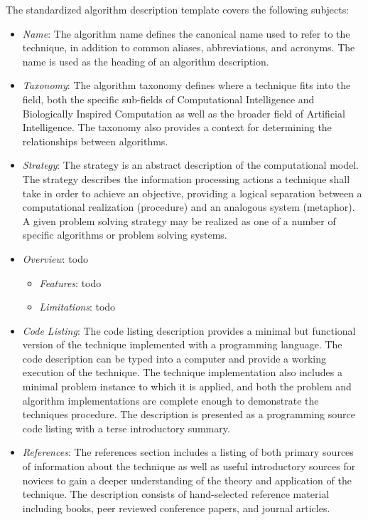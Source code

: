 The standardized algorithm description template covers the following subjects:
\begin{itemize}
	\item \emph{Name}: The algorithm name defines the canonical name used to refer to the technique, in addition to common aliases, abbreviations, and acronyms. The name is used as the heading of an algorithm description.
	\item \emph{Taxonomy}: The algorithm taxonomy defines where a technique fits into the field, both the specific sub-fields of Computational Intelligence and Biologically Inspired Computation as well as the broader field of Artificial Intelligence. The taxonomy also provides a context for determining the relationships between algorithms.
	\item \emph{Strategy}: The strategy is an abstract description of the computational model. The strategy describes the information processing actions a technique shall take in order to achieve an objective, providing a logical separation between a computational realization (procedure) and an analogous system (metaphor). A given problem solving strategy may be realized as one of a number of specific algorithms or problem solving systems.
	\item \emph{Overview}: todo
	 \begin{itemize}
			\item \emph{Features}: todo
			\item \emph{Limitations}: todo
		\end{itemize}
	\item \emph{Code Listing}: The code listing description provides a minimal but functional version of the technique implemented with a programming language. The code description can be typed into a computer and provide a working execution of the technique. The technique implementation also includes a minimal problem instance to which it is applied, and both the problem and algorithm implementations are complete enough to demonstrate the techniques procedure. The description is presented as a programming source code listing with a terse introductory summary.
	\item \emph{References}: The references section includes a listing of both primary sources of information about the technique as well as useful introductory sources for novices to gain a deeper understanding of the theory and application of the technique. The description consists of hand-selected reference material including books, peer reviewed conference papers, and journal articles.
\end{itemize}



